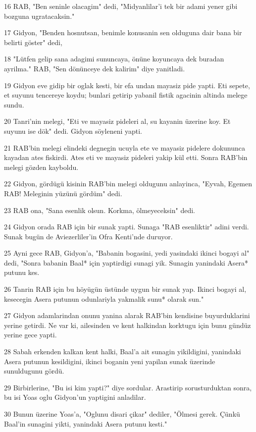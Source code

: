 \par 16 RAB, "Ben seninle olacagim" dedi, "Midyanlilar'i tek bir adami yener gibi bozguna ugratacaksin."
\par 17 Gidyon, "Benden hosnutsan, benimle konusanin sen olduguna dair bana bir belirti göster" dedi,
\par 18 "Lütfen gelip sana adagimi sununcaya, önüne koyuncaya dek buradan ayrilma." RAB, "Sen dönünceye dek kalirim" diye yanitladi.
\par 19 Gidyon eve gidip bir oglak kesti, bir efa undan mayasiz pide yapti. Eti sepete, et suyunu tencereye koydu; bunlari getirip yabanil fistik agacinin altinda melege sundu.
\par 20 Tanri'nin melegi, "Eti ve mayasiz pideleri al, su kayanin üzerine koy. Et suyunu ise dök" dedi. Gidyon söyleneni yapti.
\par 21 RAB'bin melegi elindeki degnegin ucuyla ete ve mayasiz pidelere dokununca kayadan ates fiskirdi. Ates eti ve mayasiz pideleri yakip kül etti. Sonra RAB'bin melegi gözden kayboldu.
\par 22 Gidyon, gördügü kisinin RAB'bin melegi oldugunu anlayinca, "Eyvah, Egemen RAB! Meleginin yüzünü gördüm" dedi.
\par 23 RAB ona, "Sana esenlik olsun. Korkma, ölmeyeceksin" dedi.
\par 24 Gidyon orada RAB için bir sunak yapti. Sunaga "RAB esenliktir" adini verdi. Sunak bugün de Aviezerliler'in Ofra Kenti'nde duruyor.
\par 25 Ayni gece RAB, Gidyon'a, "Babanin bogasini, yedi yasindaki ikinci bogayi al" dedi, "Sonra babanin Baal* için yaptirdigi sunagi yik. Sunagin yanindaki Asera* putunu kes.
\par 26 Tanrin RAB için bu höyügün üstünde uygun bir sunak yap. Ikinci bogayi al, kesecegin Asera putunun odunlariyla yakmalik sunu* olarak sun."
\par 27 Gidyon adamlarindan onunu yanina alarak RAB'bin kendisine buyurduklarini yerine getirdi. Ne var ki, ailesinden ve kent halkindan korktugu için bunu gündüz yerine gece yapti.
\par 28 Sabah erkenden kalkan kent halki, Baal'a ait sunagin yikildigini, yanindaki Asera putunun kesildigini, ikinci boganin yeni yapilan sunak üzerinde sunuldugunu gördü.
\par 29 Birbirlerine, "Bu isi kim yapti?" diye sordular. Arastirip sorusturduktan sonra, bu isi Yoas oglu Gidyon'un yaptigini anladilar.
\par 30 Bunun üzerine Yoas'a, "Oglunu disari çikar" dediler, "Ölmesi gerek. Çünkü Baal'in sunagini yikti, yanindaki Asera putunu kesti."

